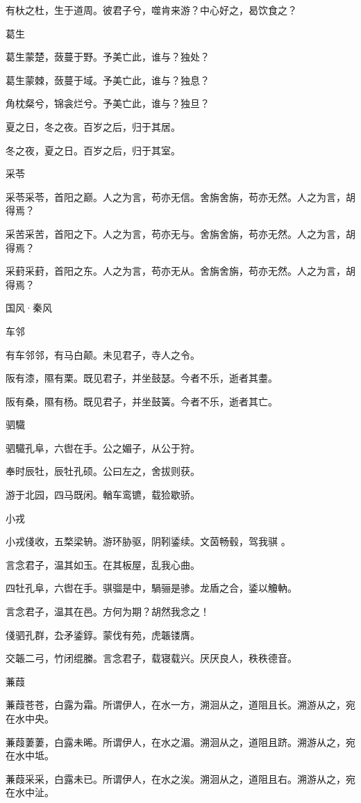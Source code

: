 有杕之杜，生于道周。彼君子兮，噬肯来游？中心好之，曷饮食之？

葛生

葛生蒙楚，蔹蔓于野。予美亡此，谁与？独处？

葛生蒙棘，蔹蔓于域。予美亡此，谁与？独息？

角枕粲兮，锦衾烂兮。予美亡此，谁与？独旦？

夏之日，冬之夜。百岁之后，归于其居。

冬之夜，夏之日。百岁之后，归于其室。

采苓

采苓采苓，首阳之巅。人之为言，苟亦无信。舍旃舍旃，苟亦无然。人之为言，胡得焉？

采苦采苦，首阳之下。人之为言，苟亦无与。舍旃舍旃，苟亦无然。人之为言，胡得焉？

采葑采葑，首阳之东。人之为言，苟亦无从。舍旃舍旃，苟亦无然。人之为言，胡得焉？




国风·秦风


车邻

有车邻邻，有马白颠。未见君子，寺人之令。

阪有漆，隰有栗。既见君子，并坐鼓瑟。今者不乐，逝者其耋。

阪有桑，隰有杨。既见君子，并坐鼓簧。今者不乐，逝者其亡。

驷驖

驷驖孔阜，六辔在手。公之媚子，从公于狩。

奉时辰牡，辰牡孔硕。公曰左之，舍拔则获。

游于北园，四马既闲。輶车鸾镳，载猃歇骄。

小戎

小戎俴收，五楘梁辀。游环胁驱，阴靷鋈续。文茵畅毂，驾我骐 。

言念君子，温其如玉。在其板屋，乱我心曲。

四牡孔阜，六辔在手。骐骝是中，騧骊是骖。龙盾之合，鋈以觼軜。

言念君子，温其在邑。方何为期？胡然我念之！

俴驷孔群，厹矛鋈錞。蒙伐有苑，虎韔镂膺。

交韔二弓，竹闭绲縢。言念君子，载寝载兴。厌厌良人，秩秩德音。

蒹葭

蒹葭苍苍，白露为霜。所谓伊人，在水一方，溯洄从之，道阻且长。溯游从之，宛在水中央。

蒹葭萋萋，白露未晞。所谓伊人，在水之湄。溯洄从之，道阻且跻。溯游从之，宛在水中坻。

蒹葭采采，白露未已。所谓伊人，在水之涘。溯洄从之，道阻且右。溯游从之，宛在水中沚。

